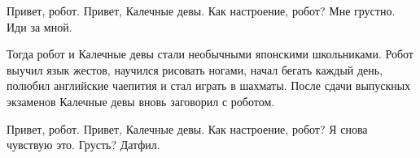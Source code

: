 \begin{dialog}
\X Привет, робот.
\R Привет, Калечные девы.
\X Как настроение, робот?
\R Мне грустно.
\X Иди за мной.
\end{dialog}

\begin{monolog}
Тогда робот и Калечные девы стали необычными японскими школьниками. Робот выучил язык жестов, научился рисовать ногами, начал бегать каждый день, полюбил английские чаепития и стал играть в шахматы. После сдачи выпускных экзаменов Калечные девы вновь заговорил с роботом.
\end{monolog}

\begin{dialog}
\X Привет, робот.
\R Привет, Калечные девы.
\X Как настроение, робот?
\R Я снова чувствую это.
\X Грусть?
\R Датфил.
\end{dialog}